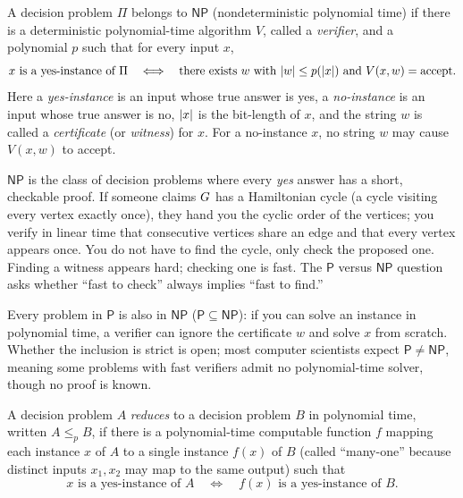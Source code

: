 \begin{definition}
\label{ch37:def-np}
A decision problem $\Pi$ belongs to $\mathsf{NP}$ (nondeterministic polynomial time) if there is a deterministic polynomial-time algorithm $V$, called a
\emph{verifier}, and a polynomial $p$ such that for every input $x$,
\[
   x \text{ is a yes-instance of } \Pi
   \quad\Longleftrightarrow\quad
   \text{there exists } w \text{ with } \lvert w\rvert\le p(\lvert x\rvert) \text{ and } V(x,w)=\text{accept}.
\]
Here a \emph{yes-instance} is an input whose true answer is yes, a \emph{no-instance} is an input whose true answer is no, $\lvert x\rvert$ is the bit-length of $x$, and the string $w$ is called a \emph{certificate} (or \emph{witness}) for $x$. For a no-instance $x$, no string $w$ may cause $V(x,w)$ to accept.
\end{definition}

\begin{intuitionbox}
$\mathsf{NP}$ is the class of decision problems where every \emph{yes} answer has a short,
checkable proof. If someone claims $G$ has a Hamiltonian cycle (a cycle visiting every vertex exactly once), they hand you the cyclic
order of the vertices; you verify in linear time that consecutive vertices share an edge
and that every vertex appears once. You do not have to find the cycle,
only check the proposed one. Finding a witness appears hard; checking one is fast.
The $\mathsf{P}$ versus $\mathsf{NP}$ question asks whether ``fast to check''
always implies ``fast to find.''
\end{intuitionbox}

Every problem in $\mathsf{P}$ is also in $\mathsf{NP}$ ($\mathsf{P}\subseteq\mathsf{NP}$): if you can solve an instance in polynomial time, a verifier can ignore the certificate $w$ and solve $x$ from scratch. Whether the inclusion is strict is open; most computer scientists expect $\mathsf{P}\neq\mathsf{NP}$, meaning some problems with fast verifiers admit no polynomial-time solver, though no proof is known.

\begin{definition}
\label{ch37:def-reduction}
A decision problem $A$ \emph{reduces} to a decision problem $B$ in polynomial time, written $A\le_p B$, if there is a
polynomial-time computable function $f$ mapping each instance $x$ of $A$ to a single instance $f(x)$ of
$B$ (called ``many-one'' because distinct inputs $x_1,x_2$ may map to the same output) such that
\[
   x \text{ is a yes-instance of } A
   \quad\Longleftrightarrow\quad
   f(x) \text{ is a yes-instance of } B.
\]
\end{definition}

